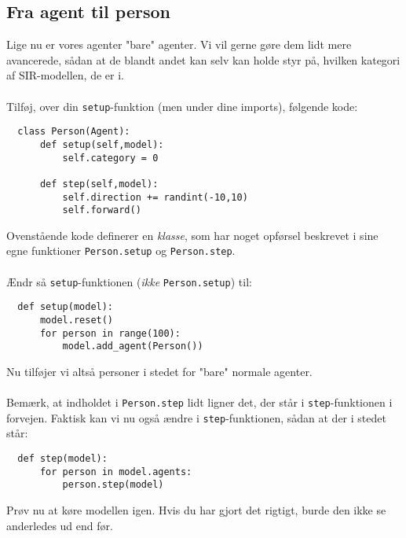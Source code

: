 \documentclass{article}
\begin{document}
\subsection{Fra agent til person}
Lige nu er vores agenter "bare" agenter. Vi vil gerne gøre dem lidt mere avancerede, sådan at de blandt andet kan selv kan holde styr på, hvilken kategori af SIR-modellen, de er i.\\\\
Tilføj, over din \texttt{setup}-funktion (men under dine imports), følgende kode:
\begin{lstlisting}
  class Person(Agent):
      def setup(self,model):
          self.category = 0

      def step(self,model):
          self.direction += randint(-10,10)
          self.forward()
\end{lstlisting}
Ovenstående kode definerer en \textit{klasse}, som har noget opførsel beskrevet i sine egne funktioner \texttt{Person.setup} og \texttt{Person.step}.\\\\
Ændr så \texttt{setup}-funktionen (\textit{ikke} \texttt{Person.setup}) til:
\begin{lstlisting}
  def setup(model):
      model.reset()
      for person in range(100):
          model.add_agent(Person())
\end{lstlisting}
Nu tilføjer vi altså personer i stedet for "bare" normale agenter.\\\\
Bemærk, at indholdet i \texttt{Person.step} lidt ligner det, der står i \texttt{step}-funktionen i forvejen. Faktisk kan vi nu også ændre i \texttt{step}-funktionen, sådan at der i stedet står:
\begin{lstlisting}
  def step(model):
      for person in model.agents:
          person.step(model)
\end{lstlisting}
Prøv nu at køre modellen igen. Hvis du har gjort det rigtigt, burde den ikke se anderledes ud end før.
\end{document}
